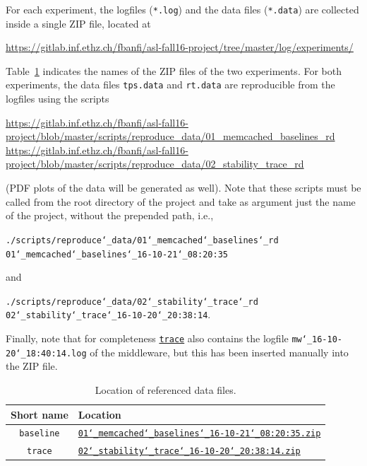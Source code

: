 \documentclass[11pt]{article}
\theoremstyle{definition}
\renewcommand\t\texttt
\newcommand\baselined{01\char`_memcached\char`_baselines\char`_16-10-21\char`_08:20:35}
\newcommand\baseline{01_memcached_baselines_16-10-21_08:20:35}
\newcommand\traced{02\char`_stability\char`_trace\char`_16-10-20\char`_20:38:14}
\newcommand\trace{02_stability_trace_16-10-20_20:38:14}
\begin{document}
For each experiment, the logfiles (\t{*.log}) and the data files (\t{*.data}) are collected inside a single ZIP file, located at
\begin{center}
    \url{https://gitlab.inf.ethz.ch/fbanfi/asl-fall16-project/tree/master/log/experiments/}
\end{center}
Table~\ref{tab:logs} indicates the names of the ZIP files of the two experiments.
For both experiments, the data files \t{tps.data} and \t{rt.data} are reproducible from the logfiles using the scripts
\begin{center}
    \url{https://gitlab.inf.ethz.ch/fbanfi/asl-fall16-project/blob/master/scripts/reproduce_data/01_memcached_baselines_rd}\vspace{2mm}\\
    \url{https://gitlab.inf.ethz.ch/fbanfi/asl-fall16-project/blob/master/scripts/reproduce_data/02_stability_trace_rd}
\end{center}
(PDF plots of the data will be generated as well).
Note that these scripts must be called from the root directory of the project and take as argument just the name of the project, without the prepended path, i.e.,
\begin{center}
    \t{./scripts/reproduce\char`_data/01\char`_memcached\char`_baselines\char`_rd \baselined}
\end{center}
and
\begin{center}
    \t{./scripts/reproduce\char`_data/02\char`_stability\char`_trace\char`_rd \traced}.
\end{center}
Finally, note that for completeness \hyperref[f:trace]{\t{trace}} also contains the logfile \t{mw\char`_16-10-20\char`_18:40:14.log} of the middleware, but this has been inserted manually into the ZIP file.

\begin{table}[h]
    \centering
    \small
    {
        \smallskip
        \begin{tabular}{|c|l|}
        \hline
        \textbf{Short name} & \textbf{Location} \\ 
        \hline\hline
        \t{baseline}\label{f:baseline} & \href{https://gitlab.inf.ethz.ch/fbanfi/asl-fall16-project/blob/master/log/experiments/\baseline.zip}{\t{\baselined.zip}} \\     
        \hline
        \t{trace}\label{f:trace} & \href{https://gitlab.inf.ethz.ch/fbanfi/asl-fall16-project/blob/master/log/experiments/\trace.zip}{\t{\traced.zip}} \\
        \hline 
        \end{tabular} 
    }
    \caption{Location of referenced data files.}
    \label{tab:logs}
\end{table}
\end{document}
